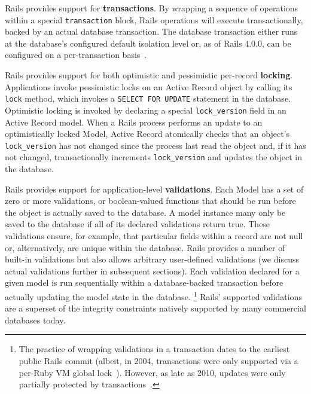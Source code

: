 \begin{myenumerate}
\item Rails provides support for \textbf{transactions}. By wrapping a
sequence of operations within a special \texttt{transaction} block,
Rails operations will execute transactionally, backed by an actual
database transaction. The database transaction either runs at the
database's configured default isolation level or, as of Rails 4.0.0, can
be configured on a per-transaction
basis~\cite{code-transaction-isolation}.

\item Rails provides support for both optimistic and pessimistic
  per-record \textbf{locking}. Applications invoke pessimistic locks
  on an Active Record object by calling its \texttt{lock} method,
  which invokes a \texttt{SELECT FOR UPDATE} statement in the
  database. Optimistic locking is invoked by declaring a special
  \texttt{lock\_version} field in an Active Record model. When a Rails
  process performs an update to an optimistically locked Model, Active
  Record atomically checks that an object's \texttt{lock\_version} has
  not changed since the process last read the object and, if it has
  not changed, transactionally increments \texttt{lock\_version} and updates the
  object in the database.

\item Rails provides support for application-level
  \textbf{validations}. Each Model has a set of zero or more
  validations, or boolean-valued functions that should be run before
  the object is actually saved to the database. A model instance many
  only be saved to the database if all of its declared validations
  return true. These validations ensure, for example, that particular
  fields within a record are not null or, alternatively, are unique
  within the database. Rails provides a number of built-in validations
  but also allows arbitrary user-defined validations (we discuss
  actual validations further in subsequent sections). Each validation
  declared for a given model is run sequentially within a
  database-backed transaction before actually updating the model state
  in the database.  \footnote{The practice of wrapping validations in
    a transaction dates to the earliest public Rails commit (albeit,
    in 2004, transactions were only supported via a per-Ruby VM global
    lock~\cite{code-txn-lock}). However, as late as 2010, updates were
    only partially protected by
    transactions~\cite{code-txn-update}.} Rails' supported
  validations are a superset of the integrity constraints natively
  supported by many commercial databases today.\\[-2mm] 


\end{myenumerate}
